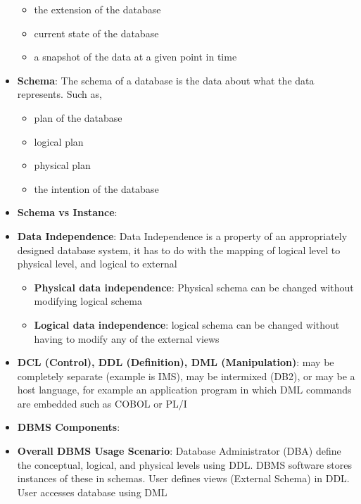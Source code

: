 \documentclass{report}
\begin{document}
\begin{itemize}
            \begin{itemize}
                \item the extension of the database
                \item current state of the database
                \item a snapshot of the data at a given point in time
            \end{itemize}
        \item \textbf{Schema}: The schema of a database is the data about what the data represents. Such as,
            \begin{itemize}
                \item plan of the database
                \item logical plan
                \item physical plan
                \item the intention of the database
            \end{itemize}
        \item \textbf{Schema vs Instance}:
            \bigbreak \noindent 
        \item \textbf{Data Independence}: Data Independence is a property of an appropriately designed database system,  it has to do with the mapping of logical level to physical level, and logical to external
            \begin{itemize}
                \item \textbf{Physical data independence}:  Physical schema can be changed without modifying logical schema
                \item \textbf{Logical data independence}: logical schema can be changed without having to modify any of the external views
            \end{itemize}
        \item \textbf{DCL (Control), DDL (Definition), DML (Manipulation)}: may be completely separate (example is IMS), may be intermixed (DB2), or may be a host language, for example an  application program in which DML commands are embedded such as COBOL or PL/I
        \item \textbf{DBMS Components}:
            \bigbreak \noindent 
        \item \textbf{Overall DBMS Usage Scenario}: Database Administrator (DBA) define the conceptual, logical, and physical levels using DDL.  DBMS software stores instances of these in schemas.  User defines views (External Schema) in DDL. User accesses database using DML

\end{itemize}
\end{document}

